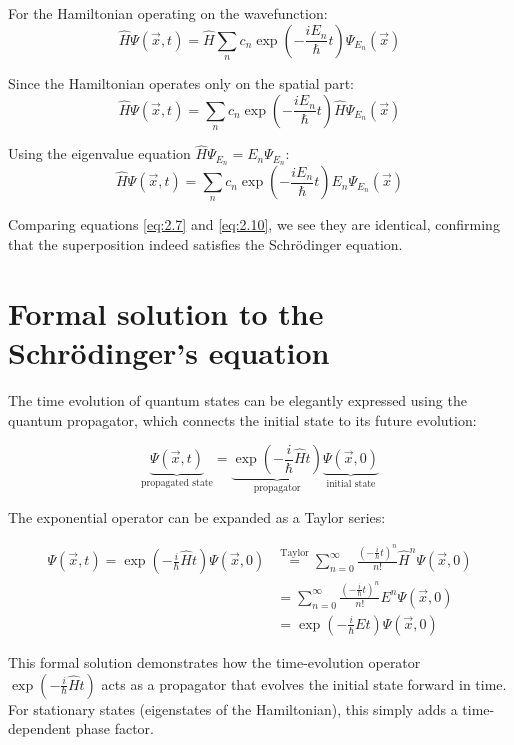 For the Hamiltonian operating on the wavefunction:
\begin{equation}
\hat{H}\Psi(\vec{x},t) = \hat{H}\sum_n c_n\exp\left(-\frac{iE_n}{\hbar}t\right)\Psi_{E_n}(\vec{x})
\end{equation}

Since the Hamiltonian operates only on the spatial part:
\begin{equation}
\hat{H}\Psi(\vec{x},t) = \sum_n c_n\exp\left(-\frac{iE_n}{\hbar}t\right)\hat{H}\Psi_{E_n}(\vec{x})
\end{equation}

Using the eigenvalue equation $\hat{H}\Psi_{E_n} = E_n\Psi_{E_n}$:
\begin{equation}
\hat{H}\Psi(\vec{x},t) = \sum_n c_n\exp\left(-\frac{iE_n}{\hbar}t\right)E_n\Psi_{E_n}(\vec{x}) \label{eq:2.10}
\end{equation}

Comparing equations \eqref{eq:2.7} and \eqref{eq:2.10}, we see they are identical, confirming that the superposition indeed satisfies the Schrödinger equation.

\section{Formal solution to the Schrödinger's equation}

The time evolution of quantum states can be elegantly expressed using the quantum propagator, which connects the initial state to its future evolution:

\begin{equation}
\underbrace{\Psi(\vec{x},t)}_{\text{propagated state}} = \underbrace{\exp\left(-\frac{i}{\hbar}\hat{H}t\right)}_{\text{propagator}}\underbrace{\Psi(\vec{x},0)}_{\text{initial state}}
\end{equation}

The exponential operator can be expanded as a Taylor series:

\begin{align}
\Psi(\vec{x},t) = \exp\left(-\frac{i}{\hbar}\hat{H}t\right)\Psi(\vec{x},0) &\stackrel{\text{Taylor}}{=} \sum_{n=0}^{\infty}\frac{\left(-\frac{i}{\hbar}t\right)^n}{n!}\hat{H}^n\Psi(\vec{x},0) \\
&= \sum_{n=0}^{\infty}\frac{\left(-\frac{i}{\hbar}t\right)^n}{n!}E^n\Psi(\vec{x},0)  \\
&= \exp\left(-\frac{i}{\hbar}Et\right)\Psi(\vec{x},0)
\end{align}

This formal solution demonstrates how the time-evolution operator $\exp\left(-\frac{i}{\hbar}\hat{H}t\right)$ acts as a propagator that evolves the initial state forward in time. For stationary states (eigenstates of the Hamiltonian), this simply adds a time-dependent phase factor.


